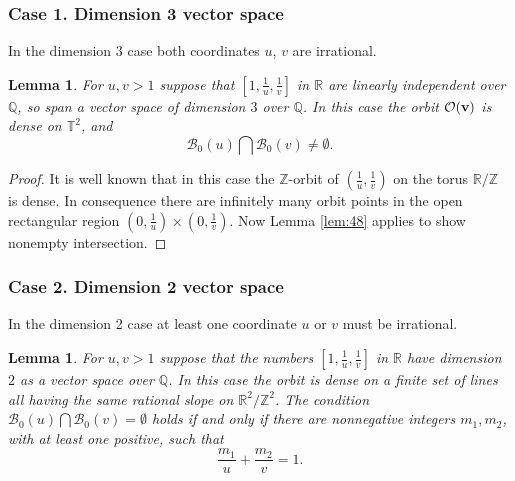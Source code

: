 \documentclass[12pt,letterpaper, reqno]{amsart}
\newtheorem{lem}[thm]{Lemma}
\theoremstyle{definition}
\theoremstyle{remark}
\newcommand{\RR}{\ensuremath{\mathbb{R}}}
\newcommand{\ZZ}{\ensuremath{\mathbb{Z}}}
\newcommand{\QQ}{\mathbb{Q}}
\newcommand{\TT}{\mathbb{T}}
\newcommand{\sB}{{\mathcal B}}
\newcommand{\bv}{{\bf v}}
\newcommand{\sO}{{\mathcal O}}
\begin{document}
\subsubsection{Case 1. Dimension 3 vector space}\label{sec:431}

In the dimension $3$ case both coordinates $u$, $v$ are irrational.
\begin{lem}\label{lem:49}
 For $u, v >1$ suppose that $[1, \frac{1}{u}, \frac{1}{v}]$ in $\RR$ are linearly 
 independent over $\QQ$, so span a vector space of dimension $3$ over $\QQ$. 
 In this case the orbit $\sO(\bv)$ is dense on $\TT^2$, and  
 $$ 
 \sB_0(u) \bigcap \sB_0(v) \ne \emptyset.
  $$
\end{lem}

\begin{proof}
It is well known that in this case the $\ZZ$-orbit of $(\frac{1}{u}, \frac{1}{v})$
on the torus $\RR/\ZZ$ is dense. In consequence there are infinitely many
orbit points in the open rectangular region $(0, \frac{1}{u}) \times (0, \frac{1}{v})$. Now
Lemma \ref{lem:48} applies to show nonempty intersection.  
\end{proof}


\subsubsection{Case 2. Dimension 2 vector space}\label{sec:432}

In the dimension 2 case at least one coordinate $u$ or $v$ must be irrational.

\begin{lem}\label{lem:410}
 For $u, v >1$ suppose that the numbers $[1, \frac{1}{u}, \frac{1}{v}]$  in $\RR$ have dimension $2$
 as a vector space over $\QQ$. In this case the orbit is dense on a finite set of lines all having the 
 same rational slope on $\RR^2/\ZZ^2$.  The condition
 $ \sB_0(u) \bigcap \sB_0(v) =  \emptyset$
 holds if and only if there are nonnegative integers $m_1,  m_2$, with at least one positive,  such that
 $$
 \frac{m_1}{u} + \frac{m_2}{v} =1.
 $$
\end{lem}
\end{document}
